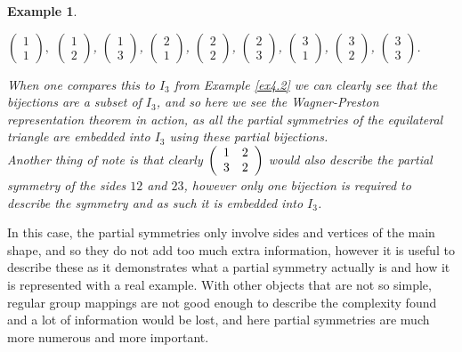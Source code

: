 \documentclass[12pt]{article}
\newtheorem{ex}[theorem]{Example}
\begin{document}
\begin{ex}
\begin{center}
		$\left(
		\begin{array}{c}
		1 \\
		1
		\end{array}
		\right),$
		$\left(
		\begin{array}{c}
		1 \\
		2
		\end{array}
		\right)$,
		$\left(
		\begin{array}{c}
		1 \\
		3
		\end{array}
		\right)$,
		$\left(
		\begin{array}{c}
		2 \\
		1
		\end{array}
		\right)$,
		$\left(
		\begin{array}{c}
		2 \\
		2
		\end{array}
		\right)$,
		$\left(
		\begin{array}{c}
		2 \\
		3
		\end{array}
		\right)$,
		$\left(
		\begin{array}{c}
		3 \\
		1
		\end{array}
		\right)$,
		$\left(
		\begin{array}{c}
		3 \\
		2
		\end{array}
		\right)$,
		$\left(
		\begin{array}{c}
		3 \\
		3
		\end{array}
		\right)$.
	\end{center}
	When one compares this to $I_3$ from Example \ref{ex4.2} we can clearly see that the bijections are a subset of $I_3$, and so here we see the Wagner-Preston representation theorem in action, as all the partial symmetries of the equilateral triangle are embedded into $I_3$ using these partial bijections.\\
	Another thing of note is that clearly 
	$\left(
		\begin{array}{c c}
		1 & 2 \\
		3 & 2 
		\end{array}
		\right)$
	would also describe the partial symmetry of the sides $12$ and $23$, however only one bijection is required to describe the symmetry and as such it is embedded into $I_3$.
\end{ex}
\noindent In this case, the partial symmetries only involve sides and vertices of the main shape, and so they do not add too much extra information, however it is useful to describe these as it demonstrates what a partial symmetry actually is and how it is represented with a real example. With other objects that are not so simple, regular group mappings are not good enough to describe the complexity found and a lot of information would be lost, and here partial symmetries are much more numerous and more important.\\
\end{document}
